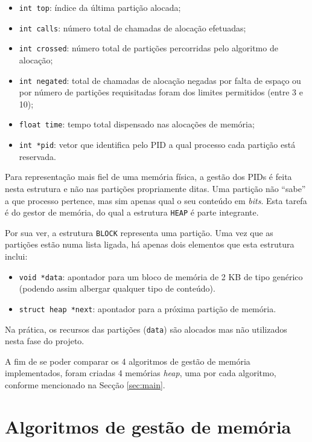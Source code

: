\documentclass[10pt,oneside]{estiloUBI}
\begin{document}
	\begin{itemize}
		\item \texttt{int top}: índice da última partição alocada;
		\item \texttt{int calls}: número total de chamadas de alocação efetuadas;
		\item \texttt{int crossed}: número total de partições percorridas pelo algoritmo de alocação;
		\item \texttt{int negated}: total de chamadas de alocação negadas por falta de espaço ou por número de partições requisitadas foram dos limites permitidos (entre 3 e 10);
		\item \texttt{float time}: tempo total dispensado nas alocações de memória;
		\item \texttt{int *pid}: vetor que identifica pelo \ac{PID} a qual processo cada partição está reservada.
	\end{itemize}

	Para representação mais fiel de uma memória física, a gestão dos \ac{PID}s é feita nesta estrutura e não nas partições propriamente ditas. Uma partição não ``sabe'' a que processo pertence, mas sim apenas qual o seu conteúdo em \textit{bits}. Esta tarefa é do gestor de memória, do qual a estrutura \verb|HEAP| é parte integrante.
	
	Por sua ver, a estrutura \verb|BLOCK| representa uma partição. Uma vez que as partições estão numa lista ligada, há apenas dois elementos que esta estrutura inclui:
	
	\begin{itemize}
		\item \texttt{void *data}: apontador para um bloco de memória de 2 KB de tipo genérico (podendo assim albergar qualquer tipo de conteúdo).
		\item \texttt{struct heap *next}: apontador para a próxima partição de memória.
	\end{itemize}
	
	Na prática, os recursos das partições (\verb|data|) são alocados mas não utilizados nesta fase do projeto.
	
	A fim de se poder comparar os 4 algoritmos de gestão de memória implementados, foram criadas 4 memórias \textit{heap}, uma por cada algoritmo, conforme mencionado na Secção \ref{sec:main}.
	
	
	\section{Algoritmos de gestão de memória}
	\label{ssec:heap:algoithms}
	
\end{document}
